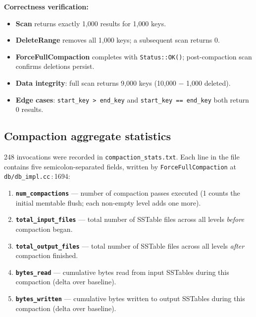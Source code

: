 \documentclass[11pt,a4paper]{article}
\newcommand{\codref}[2]{\textcolor{accent}{\texttt{\small#1}}\,$\!:\!$\textcolor{primary!70!black}{\small#2}}
\newcommand{\fname}[1]{\textcolor{primary!85!black}{\texttt{#1}}}
\newcommand{\sym}[1]{\texttt{#1}}
\begin{document}
\textbf{Correctness verification:}
\begin{itemize}[leftmargin=1.4em,itemsep=2pt]
    \item \textbf{Scan} returns exactly 1{,}000 results for 1{,}000 keys.
    \item \textbf{DeleteRange} removes all 1{,}000 keys; a subsequent scan returns 0.
    \item \textbf{ForceFullCompaction} completes with \sym{Status::OK()}; post-compaction scan confirms deletions persist.
    \item \textbf{Data integrity}: full scan returns 9{,}000 keys (10{,}000 $-$ 1{,}000 deleted).
    \item \textbf{Edge cases}: \sym{start\_key > end\_key} and \sym{start\_key == end\_key} both return 0 results.
\end{itemize}

\subsection{Compaction aggregate statistics}

248 invocations were recorded in \fname{compaction\_stats.txt}.
Each line in the file contains five semicolon-separated fields, written by
\fname{ForceFullCompaction} at \codref{db/db\_impl.cc}{1694}:

\begin{enumerate}[leftmargin=1.6em,itemsep=2pt]
    \item \textbf{\sym{num\_compactions}} --- number of compaction passes executed
          (1 counts the initial memtable flush; each non-empty level adds one more).
    \item \textbf{\sym{total\_input\_files}} --- total number of SSTable files across
          all levels \emph{before} compaction began.
    \item \textbf{\sym{total\_output\_files}} --- total number of SSTable files across
          all levels \emph{after} compaction finished.
    \item \textbf{\sym{bytes\_read}} --- cumulative bytes read from input SSTables
          during this compaction (delta over baseline).
    \item \textbf{\sym{bytes\_written}} --- cumulative bytes written to output SSTables
          during this compaction (delta over baseline).
\end{enumerate}
\end{document}
